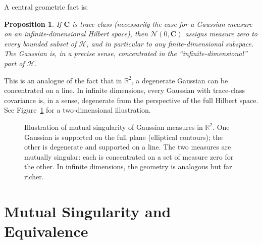 \documentclass[12pt, oneside]{book}
\theoremstyle{plain}
\newtheorem{proposition}[theorem]{Proposition}
\theoremstyle{definition}
\newcommand{\R}{\mathbb{R}}
\newcommand{\calH}{\mathcal{H}}
\newcommand{\calN}{\mathcal{N}}
\newcommand{\PP}{\mathbb{P}}
\newcommand{\QQ}{\mathbb{Q}}
\begin{document}
A central geometric fact is:

\begin{proposition}
If $\mathbf{C}$ is trace-class (necessarily the case for a Gaussian measure on an infinite-dimensional Hilbert space), then $\calN(0, \mathbf{C})$ assigns measure zero to every bounded subset of $\calH$, and in particular to any finite-dimensional subspace. The Gaussian is, in a precise sense, concentrated in the ``infinite-dimensional'' part of $\calH$.
\end{proposition}

This is an analogue of the fact that in $\R^2$, a degenerate Gaussian can be concentrated on a line. In infinite dimensions, every Gaussian with trace-class covariance is, in a sense, degenerate from the perspective of the full Hilbert space. See Figure~\ref{fig:gaussian_support} for a two-dimensional illustration.

\begin{figure}[h]
\centering
{}
\caption{Illustration of mutual singularity of Gaussian measures in $\R^2$. One Gaussian is supported on the full plane (elliptical contours); the other is degenerate and supported on a line. The two measures are mutually singular: each is concentrated on a set of measure zero for the other. In infinite dimensions, the geometry is analogous but far richer.}
\label{fig:gaussian_support}
\end{figure}

\section{Mutual Singularity and Equivalence}
\end{document}
